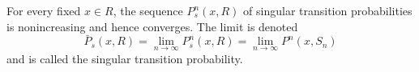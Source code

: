 For every fixed $x \in R$, the sequence $P_s^n(x, R)$ of singular transition probabilities is nonincreasing and hence converges. The limit is denoted
$$\bar{P}_s(x, R) = \lim_{n \to \infty} P_s^n(x, R) = \lim_{n \to \infty} P^n(x, S_n)$$
and is called the singular transition probability.
